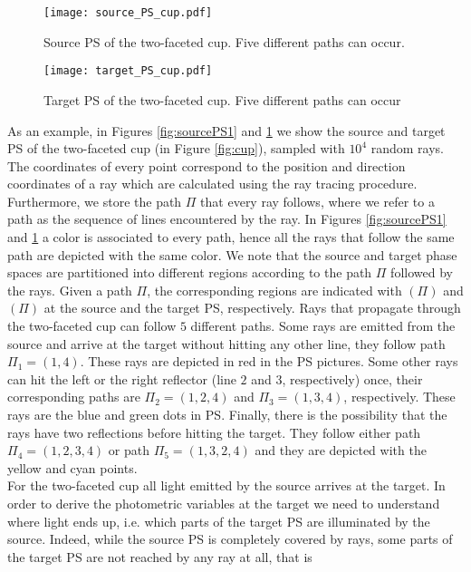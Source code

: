 \begin{figure}[h]
  \begin{minipage}[]{0.49\textwidth}
\centering
    \texttt{[image: source\_PS\_cup.pdf]}
    \caption{Source PS of the two-faceted cup. Five different paths can occur.}
    \label{fig:sourcePS1}
  \end{minipage}
\hspace{0.2cm}
  \begin{minipage}[]{0.49\textwidth}
\centering
    \texttt{[image: target\_PS\_cup.pdf]}
  \caption{Target PS of the two-faceted cup. Five different paths can occur}
   \label{fig:targetPS1}
 \end{minipage}
\end{figure}
As an example, in Figures \ref{fig:sourcePS1} and \ref{fig:targetPS1} we show the source and target PS of the two-faceted cup (in Figure \ref{fig:cup}), sampled with $10^4$ random rays. The coordinates of every point correspond to the position and direction coordinates of a ray which are calculated using the ray tracing procedure. Furthermore, we store the path $\Pi$ that every ray follows, where we refer to a path as the sequence of lines encountered by the ray.
In Figures \ref{fig:sourcePS1} and \ref{fig:targetPS1} a color is associated to every path, hence all the rays that follow the same path are depicted with the same color.
We note that the source and target phase spaces are partitioned into different regions according to the path $\Pi$ followed by the rays.
Given a path $\Pi$, the corresponding regions are indicated with $(\Pi)$ and $(\Pi)$ at the source and the target PS, respectively.
Rays that propagate through the two-faceted cup can follow $5$ different paths. Some rays are emitted from the source and arrive at the target without hitting any other line, they follow path $\Pi_1= (1,4)$. These rays are depicted in red in the PS pictures. Some other rays can hit the left or the right reflector (line $2$ and $3$, respectively) once, their corresponding paths are $\Pi_2 = (1,2,4)$ and $\Pi_3 = (1,3,4)$, respectively. These rays are the blue and green dots in PS. Finally, there is the possibility that the rays have two reflections before hitting the target. They follow either path $\Pi_4 = (1,2,3,4)$ or path $\Pi_5 = (1,3,2,4)$ and they are depicted with the yellow and cyan points.
\\ \indent For the two-faceted cup all light emitted by the source arrives at the target. In order to derive the photometric variables at the target we need to understand where light ends up, i.e. which parts of the target PS are illuminated by the source. Indeed, while the source PS is completely covered by rays, some parts of the target PS are not reached by any ray at all, that is 
